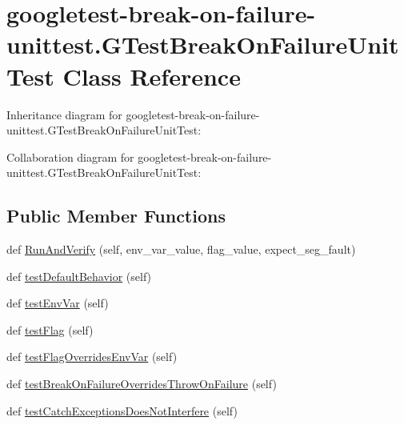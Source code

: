 \hypertarget{classgoogletest-break-on-failure-unittest_1_1GTestBreakOnFailureUnitTest}{}\section{googletest-\/break-\/on-\/failure-\/unittest.G\+Test\+Break\+On\+Failure\+Unit\+Test Class Reference}
\label{classgoogletest-break-on-failure-unittest_1_1GTestBreakOnFailureUnitTest}


Inheritance diagram for googletest-\/break-\/on-\/failure-\/unittest.G\+Test\+Break\+On\+Failure\+Unit\+Test\+:


Collaboration diagram for googletest-\/break-\/on-\/failure-\/unittest.G\+Test\+Break\+On\+Failure\+Unit\+Test\+:
\subsection*{Public Member Functions}
\begin{DoxyCompactItemize}
\item 
def \hyperlink{classgoogletest-break-on-failure-unittest_1_1GTestBreakOnFailureUnitTest_a04676ed51e337fa6be3f99a73a87040d}{Run\+And\+Verify} (self, env\+\_\+var\+\_\+value, flag\+\_\+value, expect\+\_\+seg\+\_\+fault)
\item 
def \hyperlink{classgoogletest-break-on-failure-unittest_1_1GTestBreakOnFailureUnitTest_a68448a786ffe492e830d82ee1a22742e}{test\+Default\+Behavior} (self)
\item 
def \hyperlink{classgoogletest-break-on-failure-unittest_1_1GTestBreakOnFailureUnitTest_a8981e95089e39d0c06fe0dd02dcb9bb7}{test\+Env\+Var} (self)
\item 
def \hyperlink{classgoogletest-break-on-failure-unittest_1_1GTestBreakOnFailureUnitTest_abb611980cd810b5d79e39c5973858a49}{test\+Flag} (self)
\item 
def \hyperlink{classgoogletest-break-on-failure-unittest_1_1GTestBreakOnFailureUnitTest_ae6586983cbfbe7b25a5c406814148621}{test\+Flag\+Overrides\+Env\+Var} (self)
\item 
def \hyperlink{classgoogletest-break-on-failure-unittest_1_1GTestBreakOnFailureUnitTest_a75a96ff28298ed6901203f52684331b8}{test\+Break\+On\+Failure\+Overrides\+Throw\+On\+Failure} (self)
\item 
def \hyperlink{classgoogletest-break-on-failure-unittest_1_1GTestBreakOnFailureUnitTest_afe31b01f820ac3d69465db8c69490c2d}{test\+Catch\+Exceptions\+Does\+Not\+Interfere} (self)
\end{DoxyCompactItemize}


